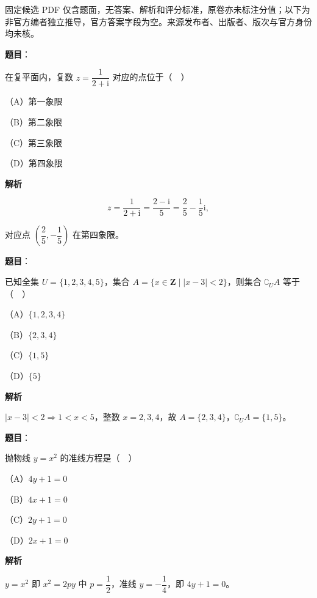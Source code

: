 

\begin{gktip}
固定候选 PDF 仅含题面，无答案、解析和评分标准，原卷亦未标注分值；以下为非官方编者独立推导，官方答案字段为空。来源发布者、出版者、版次与官方身份均未核。
\end{gktip}

\begin{answer}

\textbf{题目}：

在复平面内，复数 $z=\dfrac{1}{2+\mathrm i}$ 对应的点位于（　）

（A）第一象限

（B）第二象限

（C）第三象限

（D）第四象限

\textbf{解析}

\nopagebreak[4]
\[z=\frac1{2+\mathrm i}=\frac{2-\mathrm i}{5}=\frac25-\frac15\mathrm i,\]

对应点 $\left(\dfrac25,-\dfrac15\right)$ 在第四象限。


\end{answer}
\begin{answer}

\textbf{题目}：

已知全集 $U=\{1,2,3,4,5\}$，集合 $A=\{x\in\mathbf Z\mid |x-3|<2\}$，则集合 $\complement_UA$ 等于（　）

（A）$\{1,2,3,4\}$

（B）$\{2,3,4\}$

（C）$\{1,5\}$

（D）$\{5\}$

\textbf{解析}

$|x-3|<2\Rightarrow1<x<5$，整数 $x=2,3,4$，故 $A=\{2,3,4\}$，$\complement_UA=\{1,5\}$。


\end{answer}
\begin{answer}

\textbf{题目}：

抛物线 $y=x^2$ 的准线方程是（　）

（A）$4y+1=0$

（B）$4x+1=0$

（C）$2y+1=0$

（D）$2x+1=0$

\textbf{解析}

$y=x^2$ 即 $x^2=2py$ 中 $p=\dfrac12$，准线 $y=-\dfrac14$，即 $4y+1=0$。


\end{answer}
